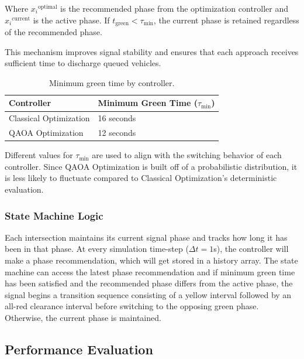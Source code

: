 \documentclass[12pt]{article}
\begin{document}
Where ${x_{i}}^{\text{optimal}}$ is the recommended phase from the optimization controller and ${x_{i}}^{\text{current}}$ is the active phase. If $t_{\text{green}} < \tau_{\text{min}}$, the current phase is retained regardless of the recommended phase.

This mechanism improves signal stability and ensures that each approach receives sufficient time to discharge queued vehicles.


\begin{table}[H]
\centering
\begin{tabular}{@{} l l @{}}
\toprule
\textbf{Controller} & \textbf{Minimum Green Time ($\tau_{\min}$)} \\
\midrule
Classical Optimization & 16 seconds \\
QAOA Optimization & 12 seconds \\
\bottomrule
\end{tabular}
\caption{Minimum green time by controller.}
\label{tab:min-green-time}
\end{table}


Different values for $\tau_{\text{min}}$ are used to align with the switching behavior of each controller. Since QAOA Optimization is built off of a probabilistic distribution, it is less likely to fluctuate compared to Classical Optimization's deterministic evaluation.

\subsubsection{State Machine Logic}

Each intersection maintains its current signal phase and tracks how long it has been in that phase. At every simulation time-step ($\Delta t = 1$s), the controller will make a phase recommendation, which will get stored in a history array. The state machine can access the latest phase recommendation and if minimum green time has been satisfied and the recommended phase differs from the active phase, the signal begins a transition sequence consisting of a yellow interval followed by an all-red clearance interval before switching to the opposing green phase. Otherwise, the current phase is maintained.

\subsection{Performance Evaluation}
\end{document}
